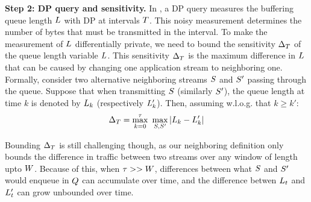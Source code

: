 \textbf{Step 2: DP query and sensitivity.}
In {\sys}, a DP query measures the buffering queue length $L$ with DP at
intervals $T$. This noisy measurement determines the number of bytes
that must be transmitted in the interval.
To make the measurement of $L$ differentially private, we need to bound the
sensitivity $\Delta_T$ of the queue length variable $L$.
This sensitivity $\Delta_T$ is the maximum difference in $L$ that can be
caused by changing one application stream to neighboring one. Formally, consider
two alternative neighboring streams $S$ and $S'$ passing through
the queue.
Suppose that when transmitting $S$ (similarly $S'$), the
queue length at time $k$ is denoted by $L_{k}$ (respectively $L_{k}'$).
Then, assuming w.l.o.g. that $k \geq k'$:
\setlength{\abovedisplayskip}{0pt}
\begin{equation}
    \Delta_T = \max_{k = 0}^{\tau}~\max_{S,
        S'} | L_{k} - L_{k}' |
    \label{eqn:ssens}
\end{equation}

Bounding $\Delta_T$ is still challenging though, as our neighboring definition
only bounds the difference in traffic between two streams over any window of
length upto $W$.
Because of this, when $\tau >> W$, differences between what
$S$ and $S'$ would enqueue in $Q$ can accumulate over time,
and the difference betwen $L_{t}$ and $L_{t}'$ can grow unbounded over
time.

